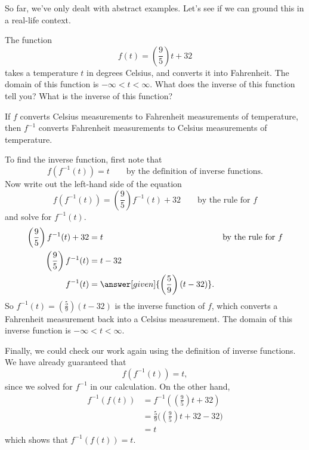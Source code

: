 \documentclass{ximera}
\begin{document}
So far, we've only dealt with abstract examples.  Let's see
if we can ground this in a real-life context.

\begin{example}
  The function
  \[
  f(t) = \left(\frac{9}{5}\right) t + 32
  \]	
  takes a temperature $t$ in degrees Celsius, and converts it into Fahrenheit.  
  The domain of this function is $-\infty < t < \infty$.  What does the inverse 
  of this function tell you? What is the inverse of this function?

  \begin{explanation}
    If $f$ converts Celsius measurements to Fahrenheit measurements of
    temperature, then $f^{-1}$ converts Fahrenheit measurements to
    Celsius measurements of temperature.
    
    To find the inverse function, first note that 
    \[
    f(f^{-1}(t)) = t \qquad \text{by the definition of inverse
      functions.}
    \]
    Now write out the left-hand side of the equation
    \[
    f(f^{-1}(t)) = \left(\frac{9}{5}\right) f^{-1}(t)+32\qquad\text{by the rule for $f$}
    \]
    and solve for $f^{-1}(t)$.
    \begin{align*}
      \left(\frac{9}{5}\right) f^{-1}(t)+32 &= t &&\text{by the rule for $f$}\\
      \left(\frac{9}{5}\right) f^{-1}(t)&= t -32\\
      f^{-1}(t) &= \answer[given]{\left(\frac{5}{9}\right)(t - 32)}.
    \end{align*}
    So $f^{-1}(t) = \left(\frac{5}{9}\right)(t - 32)$ is the inverse
    function of $f$, which converts a Fahrenheit measurement back into
    a Celsius measurement.  The domain of this inverse function is $-\infty < t <\infty$.
    
    Finally, we could check our work again using the definition of inverse functions.
     We have already guaranteed that
    \[
    f(f^{-1}(t)) = t,
    \]
    since we solved for $f^{-1}$ in our calculation.  On the other hand, 
      \begin{align*}
     f^{-1}(f(t))&=f^{-1} \left(\left(\frac{9}{5}\right)t+32\right) \\
     &= \frac{5}{9}\Big( \left(\frac{9}{5}\right)t+32-32\Big)\\
     &=t
       \end{align*}
which shows that $f^{-1}(f(t)) = t$.
  \end{explanation}
\end{example}
\end{document}
